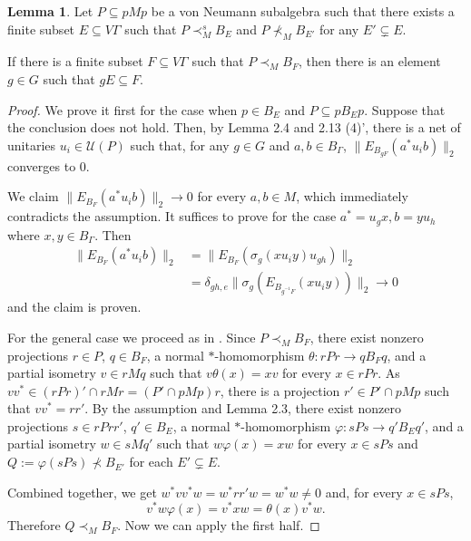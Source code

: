 \documentclass{amsart}
\theoremstyle{definition}
\newtheorem{lemma}[theorem]{Lemma}
\newtheorem{corollary}[theorem]{Corollary}
\renewcommand{\subset}{\subseteq}
\begin{document}
\begin{lemma}
Let $P\subset pMp$ be a von Neumann subalgebra such that there exists a finite subset $E\subset V\Gamma$ such that $P\prec^s_M B_E$ and $P\nprec_M B_{E'}$ for any $E'\subsetneq E$. 

If there is a finite subset $F\subset V\Gamma$ such that $P\prec_M B_F$, then there is an element $g\in G$ such that $gE\subset F$. 
\end{lemma}
\begin{proof}
We prove it first for the case when $p\in B_E$ and $P\subset pB_Ep$. Suppose that the conclusion does not hold. Then, by Lemma 2.4 and 2.13 (4)', there is a net of unitaries $u_i\in \mathcal{U}(P)$ such that, for any $g\in G$ and $a,b \in B_\Gamma$, $\|E_{B_{gF}}(a^{\ast}u_ib)\|_2$ converges to $0$. 

We claim
$\|E_{B_F}(a^{\ast}u_ib)\|_2 \to 0$
for every $a,b\in M$, which immediately contradicts the assumption. 
It suffices to prove for the case $a^{\ast}=u_gx, b=yu_h$ where $x, y\in B_{\Gamma}$. Then
\begin{align}
\|E_{B_F}(a^{\ast}u_ib)\|_2&=\|E_{B_F}(\sigma_g(xu_iy)u_{gh})\|_2 \\
&= \delta_{gh,e} \|\sigma_g(E_{B_{g^{-1}F}}(xu_iy))\|_2\to 0
\end{align}
and the claim is proven. 

For the general case we proceed as in \cite[Claim 3.6]{hi}. 
Since $P\prec_M B_F$, there exist nonzero projections $r\in P$, $q\in B_F$, a normal $\ast$-homomorphism $\theta:rPr\to qB_Fq$, and a partial isometry $v\in rMq$ such that $v\theta(x)=xv$ for every $x\in rPr$. 
As $vv^{\ast}\in (rPr)'\cap rMr = (P'\cap pMp)r$, there is a projection $r'\in P'\cap pMp$ such that $vv^{\ast} = rr'$. By the assumption and Lemma 2.3, 
there exist nonzero projections $s\in rPrr'$, $q'\in B_E$, a normal $\ast$-homomorphism $\varphi:sPs\to q'B_Eq'$, and a partial isometry $w\in sMq'$ such that $w\varphi(x)=xw$ for every $x\in sPs$
and $Q:=\varphi(sPs)\nprec B_{E'}$ for each $E'\subsetneq E$. 

Combined together, we get $w^{\ast}vv^{\ast}w=w^{\ast}rr'w=w^{\ast}w \neq 0$ and, for every $x\in sPs$, 
\[ v^{\ast}w \varphi(x) = v^{\ast}xw = \theta(x) v^{\ast}w.  \]
Therefore $Q \prec_M B_F$. Now we can apply the first half. 
\end{proof}

\end{document}

